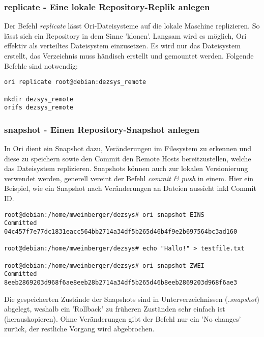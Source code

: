 \subsubsection{replicate - Eine lokale Repository-Replik anlegen}
\label{subsubsec:replicate - Eine lokale Repository-Replik anlegen}
Der Befehl \textit{replicate} lässt Ori-Dateisysteme auf die lokale Maschine replizieren. So lässt sich ein Repository in dem Sinne 'klonen'. Langsam wird es möglich, Ori effektiv als verteiltes Dateisystem einzusetzen. Es wird nur das Dateisystem erstellt, das Verzeichnis muss händisch erstellt und gemountet werden. Folgende Befehle sind notwendig:
\begin{lstlisting}[frame=single, caption=replicate]
ori replicate root@debian:dezsys_remote

mkdir dezsys_remote
orifs dezsys_remote
\end{lstlisting}

\subsubsection{snapshot - Einen Repository-Snapshot anlegen}
\label{subsubsec:snapshot - Einen Repository-Snapshot anlegen}
In Ori dient ein Snapshot dazu, Veränderungen im Filesystem zu erkennen und diese zu speichern sowie den Commit den Remote Hosts bereitzustellen, welche das Dateisystem replizieren. Snapshots können auch zur lokalen Versionierung verwendet werden, generell vereint der Befehl \textit{commit \& push} in einem. Hier ein Beispiel, wie ein Snapshot nach Veränderungen an Dateien aussieht inkl Commit ID.
\clearpage
\begin{lstlisting}[frame=single, caption=snapshot]
root@debian:/home/mweinberger/dezsys# ori snapshot EINS
Committed 04c457f7e77dc1831eacc564bb2714a34df5b265d46b4f9e2b697564bc3ad160

root@debian:/home/mweinberger/dezsys# echo "Hallo!" > testfile.txt

root@debian:/home/mweinberger/dezsys# ori snapshot ZWEI
Committed 8eeb2869203d968f6ae8eeb28b2714a34df5b265d46b8eeb2869203d968f6ae3
\end{lstlisting}
Die gespeicherten Zustände der Snapshots sind in Unterverzeichnissen (\textit{.snapshot}) abgelegt, weshalb ein 'Rollback' zu früheren Zuständen sehr einfach ist (herauskopieren). Ohne Veränderungen gibt der Befehl nur ein 'No changes' zurück, der restliche Vorgang wird abgebrochen.

